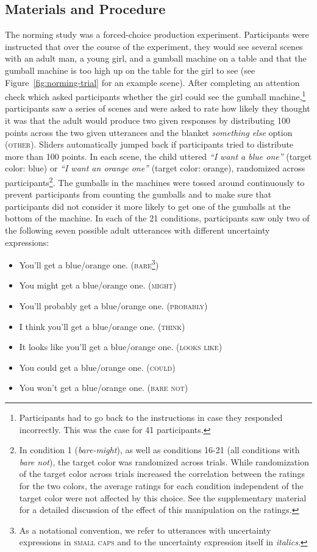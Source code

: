 \documentclass[lucida,biblatex]{sp} %
\begin{document}
\subsection{Materials and Procedure}
The norming study was a forced-choice production experiment. Participants were instructed 
that over the course of the experiment, they would see several scenes with an adult man, 
a young girl, and a gumball machine on a table and 
that the gumball machine is too high up on the table for the girl to see (see Figure~\ref{fig:norming-trial} for an example scene). 
After completing an attention check which asked participants whether 
the girl could see the gumball machine,\footnote{Participants had to go back to the instructions in case they responded incorrectly. This was the case for 41 participants.} 
participants saw a series of scenes  and were asked to rate how likely they thought it was that the 
adult would produce two given responses by distributing 100 points across the two given utterances and the 
blanket \textit{something else} option (\textsc{other}). Sliders automatically jumped back if participants tried to distribute more than 100 points. 
In each scene, the child uttered \textit{``I want a blue one''} (target color: blue) or  \textit{``I want an orange one''} (target color: orange), randomized across participants\footnote{In condition 1 (\textit{bare-might}), as well as conditions 16-21 (all conditions with \textit{bare not}), the target color was randomized across trials. While randomization of the target color across trials increased the correlation between the ratings for the two colors,  the average ratings for each condition independent of the target color were not affected by this choice. See the supplementary material for a detailed discussion of the effect of this manipulation on the ratings.}. The gumballs in the machines were tossed around continuously to prevent participants from counting the gumballs
and to make sure that participants did not consider it more likely to get one of the gumballs at the bottom of the machine.
 In each of the 21 conditions, participants saw only  two of the following seven possible adult utterances with different uncertainty expressions:

 \begin{itemize}
\item You'll get a blue/orange one. (\textsc{bare}\footnote{As a notational convention, we refer to utterances with uncertainty expressions in \textsc{small caps} and to the uncertainty expression itself in \textit{italics}. })
\item You might get a blue/orange one. (\textsc{might})
\item You'll probably get a blue/orange one. (\textsc{probably})
\item I think you'll get a blue/orange one. (\textsc{think})
\item It looks like you'll get a blue/orange one. (\textsc{looks like})
\item You could get a blue/orange one. (\textsc{could})
\item You won't get a blue/orange one. (\textsc{bare not})
\end{itemize}
\end{document}
